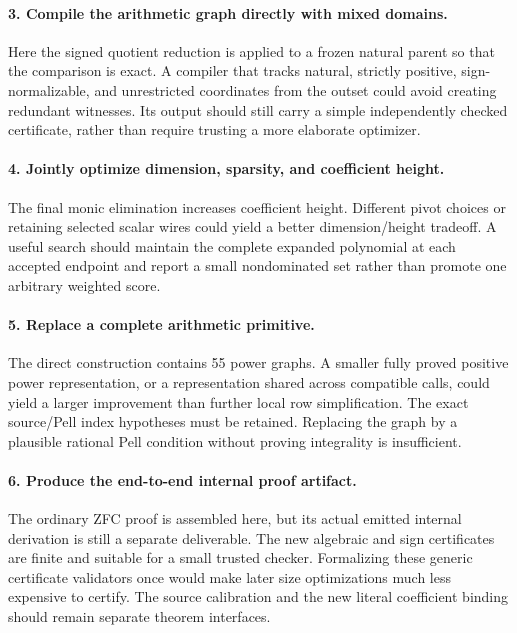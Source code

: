 \documentclass[11pt,letterpaper]{article}
\theoremstyle{definition}
\begin{document}
\paragraph{3. Compile the arithmetic graph directly with mixed domains.}
Here the signed quotient reduction is applied to a frozen natural
parent so that the comparison is exact. A compiler that tracks natural,
strictly positive, sign-normalizable, and unrestricted coordinates from
the outset could avoid creating redundant witnesses. Its output should
still carry a simple independently checked certificate, rather than
require trusting a more elaborate optimizer.

\paragraph{4. Jointly optimize dimension, sparsity, and coefficient height.}
The final monic elimination increases coefficient height. Different
pivot choices or retaining selected scalar wires could yield a better
dimension/height tradeoff. A useful search should maintain the complete
expanded polynomial at each accepted endpoint and report a small
nondominated set rather than promote one arbitrary weighted score.

\paragraph{5. Replace a complete arithmetic primitive.}
The direct construction contains 55 power graphs. A smaller
fully proved positive power representation, or a representation shared
across compatible calls, could yield a larger improvement than further
local row simplification. The exact source/Pell index hypotheses must
be retained. Replacing the graph by a plausible rational Pell condition
without proving integrality is insufficient.

\paragraph{6. Produce the end-to-end internal proof artifact.}
The ordinary ZFC proof is assembled here, but its actual emitted
internal derivation is still a separate deliverable. The new algebraic
and sign certificates are finite and suitable for a small trusted
checker. Formalizing these generic certificate validators once would
make later size optimizations much less expensive to certify. The
source calibration and the new literal coefficient binding should
remain separate theorem interfaces.
\end{document}
